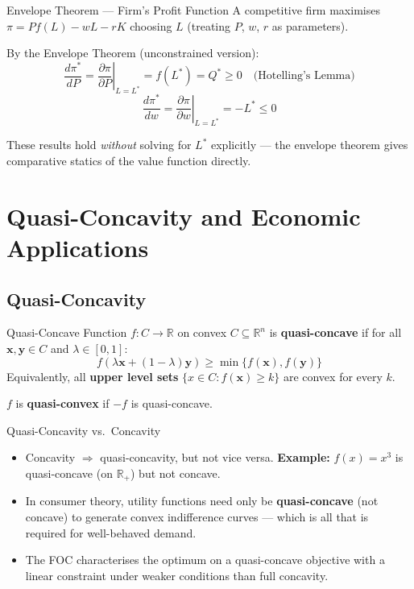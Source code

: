\documentclass[12pt, a4paper]{article}
\theoremstyle{definition}
\newcommand{\R}{\mathbb{R}}
\newcommand{\bx}{\mathbf{x}}
\newcommand{\ddd}[2]{\dfrac{d#1}{d#2}}
\newcommand{\pp}[2]{\dfrac{\partial #1}{\partial #2}}
\begin{document}
\begin{exbox}{Envelope Theorem --- Firm's Profit Function}
A competitive firm maximises $\pi = Pf(L) - wL - rK$ choosing $L$
(treating $P$, $w$, $r$ as parameters).

By the Envelope Theorem (unconstrained version):
\[
  \ddd{\pi^*}{P} = \left.\pp{\pi}{P}\right|_{L=L^*} = f(L^*) = Q^* \geq 0
  \quad\text{(Hotelling's Lemma)}
\]
\[
  \ddd{\pi^*}{w} = \left.\pp{\pi}{w}\right|_{L=L^*} = -L^* \leq 0
\]

These results hold \emph{without} solving for $L^*$ explicitly ---
the envelope theorem gives comparative statics of the value function
directly.
\end{exbox}

\section{Quasi-Concavity and Economic Applications}

\subsection{Quasi-Concavity}

\begin{defbox}{Quasi-Concave Function}
$f: C \to \R$ on convex $C \subseteq \R^n$ is \textbf{quasi-concave} if
for all $\bx, \mathbf{y} \in C$ and $\lambda \in [0,1]$:
\[
  f(\lambda\bx + (1-\lambda)\mathbf{y}) \geq \min\{f(\bx), f(\mathbf{y})\}
\]
Equivalently, all \textbf{upper level sets}
$\{x \in C : f(\bx) \geq k\}$ are convex for every $k$.

$f$ is \textbf{quasi-convex} if $-f$ is quasi-concave.
\end{defbox}

\begin{keybox}{Quasi-Concavity vs.\ Concavity}
\begin{itemize}
  \item Concavity $\Rightarrow$ quasi-concavity, but not vice versa.
        \textbf{Example:} $f(x) = x^3$ is quasi-concave (on $\R_+$) but not
        concave.
  \item In consumer theory, utility functions need only be
        \textbf{quasi-concave} (not concave) to generate convex
        indifference curves --- which is all that is required for
        well-behaved demand.
  \item The FOC characterises the optimum on a quasi-concave objective with
        a linear constraint under weaker conditions than full concavity.
\end{itemize}
\end{keybox}
\end{document}
